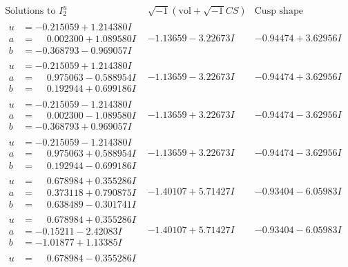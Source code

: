 \documentclass[1p]{elsarticle_modified}
\theoremstyle{definition}
\newcommand{\I}{\sqrt{-1}}
\begin{document}
$$\begin{array}{c|c|c}  
\text{Solutions to }I^u_{2}& \I (\text{vol} + \sqrt{-1}CS) & \text{Cusp shape}\\
 \hline 
\begin{aligned}
u &= -0.215059 + 1.214380 I \\
a &= \phantom{-}0.002300 + 1.089580 I \\
b &= -0.368793 - 0.969057 I\end{aligned}
 & -1.13659 - 3.22673 I & -0.94474 + 3.62956 I \\ \hline\begin{aligned}
u &= -0.215059 + 1.214380 I \\
a &= \phantom{-}0.975063 - 0.588954 I \\
b &= \phantom{-}0.192944 + 0.699186 I\end{aligned}
 & -1.13659 - 3.22673 I & -0.94474 + 3.62956 I \\ \hline\begin{aligned}
u &= -0.215059 - 1.214380 I \\
a &= \phantom{-}0.002300 - 1.089580 I \\
b &= -0.368793 + 0.969057 I\end{aligned}
 & -1.13659 + 3.22673 I & -0.94474 - 3.62956 I \\ \hline\begin{aligned}
u &= -0.215059 - 1.214380 I \\
a &= \phantom{-}0.975063 + 0.588954 I \\
b &= \phantom{-}0.192944 - 0.699186 I\end{aligned}
 & -1.13659 + 3.22673 I & -0.94474 - 3.62956 I \\ \hline\begin{aligned}
u &= \phantom{-}0.678984 + 0.355286 I \\
a &= \phantom{-}0.373118 + 0.790875 I \\
b &= \phantom{-}0.638489 - 0.301741 I\end{aligned}
 & -1.40107 + 5.71427 I & -0.93404 - 6.05983 I \\ \hline\begin{aligned}
u &= \phantom{-}0.678984 + 0.355286 I \\
a &= -0.15211 - 2.42083 I \\
b &= -1.01877 + 1.13385 I\end{aligned}
 & -1.40107 + 5.71427 I & -0.93404 - 6.05983 I \\ \hline\begin{aligned}
u &= \phantom{-}0.678984 - 0.355286 I \\

\end{aligned}
\end{array}$$
\end{document}
